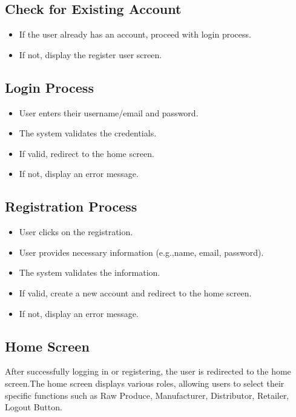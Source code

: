 \documentclass[conference]{IEEEtran}
\begin{document}
\subsection{Check for Existing Account}
\begin{itemize}
    \item  If the user already has an account, proceed with login process.
    \item  If not, display the register user screen.
\end{itemize}

\subsection{Login Process}

\begin{itemize}
    \item User enters their username/email and password.
    \item The system validates the credentials.
    \item If valid, redirect to the home screen.
    \item  If not, display an error message.
\end{itemize}

\subsection{Registration Process}
\begin{itemize}
    \item User clicks on the registration.
    \item User provides necessary information (e.g.,name, email, password).
    \item The system validates the information.
    \item If valid, create a new account and redirect to the home screen.
    \item If not, display an error message.
\end{itemize}

\subsection{Home Screen}
 After successfully logging in or registering, the user is redirected to the home screen.The home screen displays various roles, allowing users to select their specific functions such as
 Raw Produce,
 Manufacturer,
 Distributor,
 Retailer,
 Logout Button.
\end{document}
